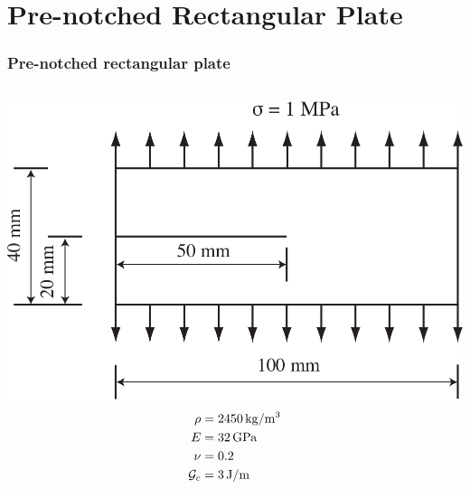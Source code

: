 \documentclass{beamer}
\begin{document}
\section{Pre-notched Rectangular Plate}

\begin{frame}
  \frametitle{Pre-notched rectangular plate}

  \begin{columns}[c]
    \includegraphics[width=\textwidth]{figs/Rectangle}
    \begin{align*}
      \rho &= \SI{2450}{\kilo\gram/\meter^3} \\
      E &= \SI{32}{\giga\pascal} \\
      \nu &= 0.2 \\
      {\cal G}_c &= \SI{3}{\joule/\meter}
    \end{align*}
  \end{columns}
\end{frame}
\end{document}
